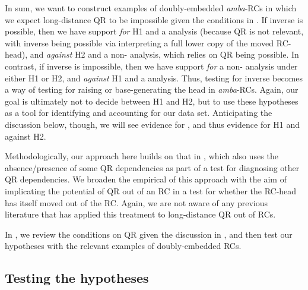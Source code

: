 \documentclass[output=paper
,newtxmath
,modfonts
,nonflat]{langsci/langscibook}
\begin{document}
In sum, we want to construct examples of doubly-embedded \textit{amba}{}-RCs in which we expect long-distance QR to be impossible given the conditions in \citet{Fox2000}. If inverse  is possible, then we have support \textit{for} H1 and a  analysis (because QR is not relevant, with inverse  being possible via interpreting a full lower copy of the moved RC-head), and \textit{against} H2 and a non- analysis, which relies on QR being possible. In contrast, if inverse  is impossible, then we have support \textit{for} a non- analysis under either H1 or H2, and \textit{against} H1 and a  analysis. Thus, testing for inverse  becomes a way of testing for raising or base-generating the head in \textit{amba}{}-RCs. Again, our goal is ultimately not to decide between H1 and H2, but to use these hypotheses as a tool for identifying  and accounting for our data set. Anticipating the discussion below, though, we will see evidence for , and thus evidence for H1 and against H2.

Methodologically, our approach here builds on that in \citet{Fox2000}, which also uses the absence/presence of some QR dependencies as part of a test for diagnosing other QR dependencies. We broaden the empirical  of this approach with the aim of implicating the potential of QR out of an RC in a test for whether the RC-head has itself moved out of the RC. Again, we are not aware of any previous literature that has applied this treatment to long-distance QR out of RCs. 

In , we review the conditions on QR given the discussion in \citet{Fox2000}, and then test our hypotheses with the relevant examples of doubly-embedded RCs.

\subsection{Testing the hypotheses}\label{sec:gould:4.2}
\end{document}
